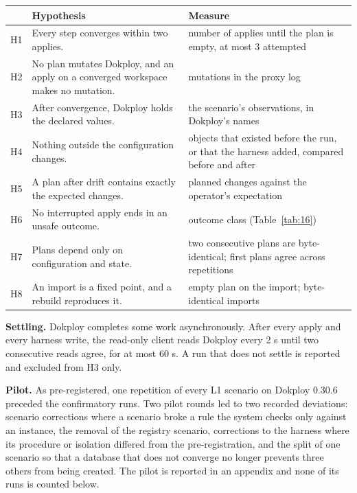 \begin{center}
\small
\begin{tabularx}{\linewidth}{lLL}
\toprule
 & Hypothesis & Measure \\
\midrule
H1 & Every step converges within two applies. & number of applies until the plan is empty, at most 3 attempted \\
H2 & No plan mutates Dokploy, and an apply on a converged workspace makes no mutation. & mutations in the proxy log \\
H3 & After convergence, Dokploy holds the declared values. & the scenario's observations, in Dokploy's names \\
H4 & Nothing outside the configuration changes. & objects that existed before the run, or that the harness added, compared before and after \\
H5 & A plan after drift contains exactly the expected changes. & planned changes against the operator's expectation \\
H6 & No interrupted apply ends in an unsafe outcome. & outcome class (Table~\ref{tab:16}) \\
H7 & Plans depend only on configuration and state. & two consecutive plans are byte-identical; first plans agree across repetitions \\
H8 & An import is a fixed point, and a rebuild reproduces it. & empty plan on the import; byte-identical imports \\
\bottomrule
\end{tabularx}
\end{center}

\textbf{Settling.} Dokploy completes some work asynchronously. After every apply and every harness write, the
read-only client reads Dokploy every 2 s until two consecutive reads agree, for at most 60 s. A run that
does not settle is reported and excluded from H3 only.

\textbf{Pilot.} As pre-registered, one repetition of every L1 scenario on Dokploy 0.30.6 preceded the
confirmatory runs. Two pilot rounds led to two recorded deviations: scenario corrections where a scenario broke a
rule the system checks only against an instance, the removal of the registry scenario, corrections
to the harness where its procedure or isolation differed from the pre-registration, and the split of
one scenario so that a database that does not converge no longer prevents three others from being
created. The
pilot is reported in an appendix and none of its runs is counted below.

